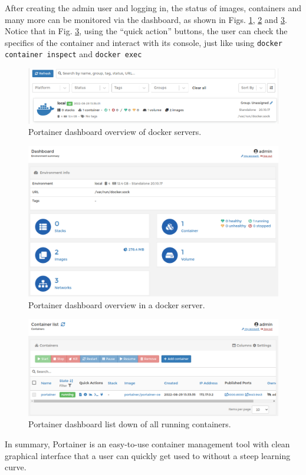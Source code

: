 After creating the admin user and logging in, the status of images, containers and many more can be monitored via the dashboard, as shown in Figs. \ref{ch:vac:fig:portainerdashboard1}, \ref{ch:vac:fig:portainerdashboard2} and \ref{ch:vac:fig:portainerdashboard3}. Notice that in Fig. \ref{ch:vac:fig:portainerdashboard3}, using the ``quick action'' buttons, the user can check the specifics of the container and interact with its console, just like using \verb|docker container inspect| and \verb|docker exec|
\begin{figure}[htbp]
	\centering
	\includegraphics[width=350pt]{chapters/part-3/figures/portainerdashboard1.png}
	\caption{Portainer dashboard overview of docker servers.} \label{ch:vac:fig:portainerdashboard1}
\end{figure}

\begin{figure}[htbp]
	\centering
	\includegraphics[width=350pt]{chapters/part-3/figures/portainerdashboard2.png}
	\caption{Portainer dashboard overview in a docker server.} \label{ch:vac:fig:portainerdashboard2}
\end{figure}

\begin{figure}[htbp]
	\centering
	\includegraphics[width=350pt]{chapters/part-3/figures/portainerdashboard3.png}
	\caption{Portainer dashboard list down of all running containers.} \label{ch:vac:fig:portainerdashboard3}
\end{figure}

In summary, Portainer is an easy-to-use container management tool with clean graphical interface that a user can quickly get used to without a steep learning curve. 